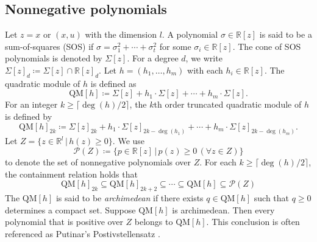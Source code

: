 \documentclass{amsart}
\theoremstyle{plain}
\newcommand{\re}{\mathbb{R}}
\numberwithin{equation}{section}
\begin{document}
		\subsection{Nonnegative polynomials}
		Let $z = x$ or $(x,u)$ with the dimension $l$.
			A polynomial $\sigma\in\re[z]$ is said to be a sum-of-squares (SOS) if 
			$\sigma = \sigma_1^2+\cdots+\sigma_t^2$ for some $\sigma_i\in\re[z]$. 
			The cone of SOS polynomials is denoted by $\Sigma[z]$.
			For a degree $d$, we write $\Sigma[z]_{d}\coloneqq \Sigma[z]\cap \re[z]_{d}$. 
			Let $h = (h_1, \ldots, h_m)$ with each $h_i\in\re[z]$. 
			The quadratic module of $h$ is defined as 
			\[
			\mbox{QM}[h]\coloneqq \Sigma[z]+h_1\cdot \Sigma[z]+\cdots +h_m\cdot \Sigma[z].
			\]
			For an integer $k\ge \lceil \deg(h)/2\rceil$, 
			the $k$th order truncated quadratic module of $h$ is defined by
			\begin{equation}\label{eq:QMk}
				\mbox{QM}[h]_{2k}\coloneqq \Sigma[z]_{2k}+ h_1\cdot\Sigma[z]_{2k-\deg(h_1)}+\cdots+h_{m}\cdot \Sigma[z]_{2k-\deg(h_{m})}.
			\end{equation}
			Let $Z = \{z\in\re^l\,\vert\, h(z)\ge 0\}$. We use
			\[
			\mathscr{P}(Z) \coloneqq \{p\in\re[z]\,\vert\, p(z) \ge 0\,(\forall z\in Z)\}
			\]
			to denote the set of nonnegative polynomials over $Z$.
			For each $k\ge \lceil \deg(h)/2\rceil$, the containment relation holds that
			\begin{equation}\label{eq:contain}
			\mbox{QM}[h]_{2k}\subseteq \mbox{QM}[h]_{2k+2}\subseteq \cdots\subseteq 
			\mbox{QM}[h]\subseteq \mathscr{P}(Z)
			\end{equation}
			The $\mbox{QM}[h]$ is said to be \emph{archimedean} if there exists 
            $q\in\mbox{QM}[h]$ such that $q\ge 0$ determines a compact set. 
            Suppose $\mbox{QM}[h]$ is archimedean. Then every 
            polynomial that is positive over $Z$ belongs to $\mbox{QM}[h]$.
            This conclusion is often referenced as Putinar's Postivstellensatz \cite{putinar}.
			
\end{document}
